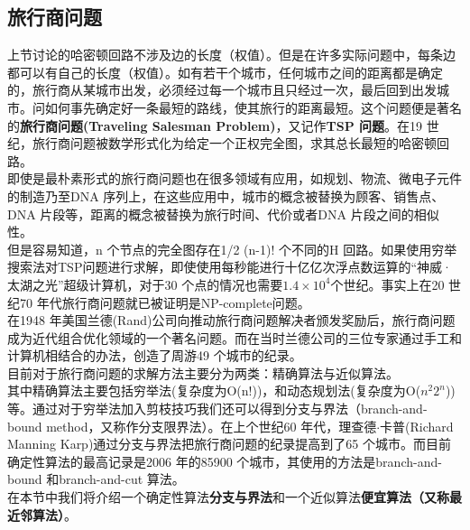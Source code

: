 \documentclass[11pt,a4paper,openany]{book}
\begin{document}
\subsection{旅行商问题}
\indent 上节讨论的哈密顿回路不涉及边的长度（权值）。但是在许多实际问题中，每条边都可以有自己的长度（权值）。如有若干个城市，任何城市之间的距离都是确定的，旅行商从某城市出发，必须经过每一个城市且只经过一次，最后回到出发城市。问如何事先确定好一条最短的路线，使其旅行的距离最短。这个问题便是著名的\textbf{旅行商问题(Traveling Salesman Problem)}，又记作\textbf{TSP 问题}。在19 世纪，旅行商问题被数学形式化为给定一个正权完全图，求其总长最短的哈密顿回路。\\
\indent 即使是最朴素形式的旅行商问题也在很多领域有应用，如规划、物流、微电子元件的制造乃至DNA 序列上，在这些应用中，城市的概念被替换为顾客、销售点、DNA 片段等，距离的概念被替换为旅行时间、代价或者DNA 片段之间的相似性。\\
\indent 但是容易知道，n 个节点的完全图存在1/2 (n-1)! 个不同的H 回路。如果使用穷举搜索法对TSP问题进行求解，即使使用每秒能进行十亿亿次浮点数运算的“神威·太湖之光”超级计算机，对于30 个点的情况也需要$1.4\times10^4$个世纪。事实上在20 世纪70 年代旅行商问题就已被证明是NP-complete问题。\\
\indent 在1948 年美国兰德(Rand)公司向推动旅行商问题解决者颁发奖励后，旅行商问题成为近代组合优化领域的一个著名问题。而在当时兰德公司的三位专家通过手工和计算机相结合的办法，创造了周游49 个城市的纪录。\\
\indent 目前对于旅行商问题的求解方法主要分为两类：精确算法与近似算法。\\
\indent 其中精确算法主要包括穷举法(复杂度为O(n!))，和动态规划法(复杂度为O($n^2 2^n$))等。通过对于穷举法加入剪枝技巧我们还可以得到分支与界法（branch-and-bound method，又称作分支限界法）。在上个世纪60 年代，理查德$\cdot$卡普(Richard Manning Karp)通过分支与界法把旅行商问题的纪录提高到了65 个城市。而目前确定性算法的最高记录是2006 年的85900 个城市，其使用的方法是branch-and-bound 和branch-and-cut 算法。\\
\indent 在本节中我们将介绍一个确定性算法\textbf{分支与界法}和一个近似算法\textbf{便宜算法（又称最近邻算法）}。
\end{document}
